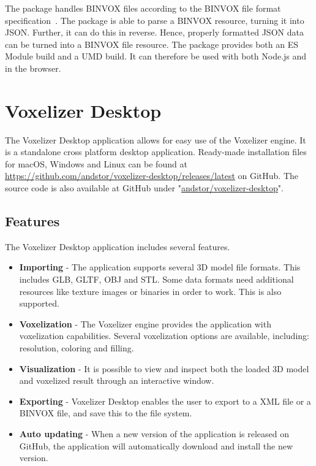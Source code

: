 The package handles BINVOX files according to the BINVOX file format specification~\cite{binvox-file-format}. The package is able to parse a BINVOX resource, turning it into JSON. Further, it can do this in reverse. Hence, properly formatted JSON data can be turned into a BINVOX file resource. The package provides both an ES Module build and a UMD build. It can therefore be used with both Node.js and in the browser.

\section{Voxelizer Desktop}
The Voxelizer Desktop application allows for easy use of the Voxelizer engine. It is a standalone cross platform desktop application. Ready-made installation files for macOS, Windows and Linux can be found at \url{https://github.com/andstor/voxelizer-desktop/releases/latest} on GitHub. The source code is also available at GitHub under "\href{https://github.com/andstor/voxelizer-desktop}{andstor/voxelizer-desktop}".

\subsection{Features}
The Voxelizer Desktop application includes several features.
\begin{itemize}
    \item \textbf{Importing} - The application supports several 3D model file formats. This includes GLB, GLTF, OBJ and STL. Some data formats need additional resources like texture images or binaries in order to work. This is also supported.
    \item \textbf{Voxelization} - The Voxelizer engine provides the application with voxelization capabilities. Several voxelization options are available, including: resolution, coloring and filling.
    \item \textbf{Visualization} - It is possible to view and inspect both the loaded 3D model and voxelized result through an interactive window.
    \item \textbf{Exporting} - Voxelizer Desktop enables the user to export to a XML file or a BINVOX file, and save this to the file system.
    \item \textbf{Auto updating} - When a new version of the application is released on GitHub, the application will automatically download and install the new version.
\end{itemize}

